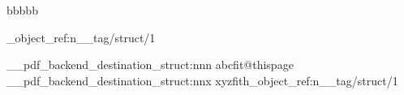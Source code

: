 \documentclass{article}
\begin{document}
bbbbb
\ExplSyntaxOn

\pdf_object_ref:n{__tag/struct/1}

\__pdf_backend_destination_struct:nnn  {abc}{fit}{@thispage}
\__pdf_backend_destination_struct:nnx  {xyz}{fith}{\pdf_object_ref:n{__tag/struct/1}}
\ExplSyntaxOff
%
%
%
%
\end{document}
